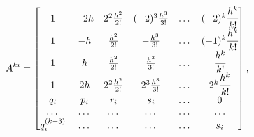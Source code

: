 \begin{equation}

\label{mvc:eq5}

    A^{ki}=

\begin{bmatrix}

      1 &   -2h & 2^2  \frac{h^{2}}{2!} &   (-2)^3\frac{h^{3}}{3!} & \dots & (-2)^k\cfrac{h^k}{k!}

   \\

      1 &   -h &   \frac{h^{2}}{2!} &   -\frac{h^{3}}{3!} & \dots & (-1)^k\cfrac{h^k}{k!}

   \\

     1 &     h &   \frac{h^{2}}{2!} &     \frac{h^{3}}{3!} & \dots & \cfrac{h^k}{k!}

   \\

     1 &     2h & 2^2  \frac{h^{2}}{2!} & 2^3  \frac{h^{3}}{3!} & \dots & 2^k\cfrac{h^k}{k!}

 \\

      q_i &     p_i &     r_i &     s_i & \dots  & 0

 \\

  \dots  & \dots  & \dots  & \dots  & \dots  & \dots

 \\

   q_i^{(k-3)}  & \dots  & \dots  & \dots & \dots & s_i

 \end{bmatrix},















\end{equation}
